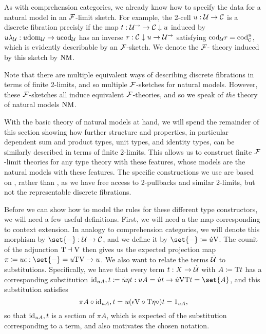\documentclass[../thesis.tex]{subfiles}
\begin{document}
As with comprehension categories, we already know how to specify the data for a natural model in an ${\mathcal{F}}$-limit
sketch. For example, the 2-cell $u : {\mathcal{U}} \to {\mathcal{C}}$ is a discrete fibration precisly if the map $t : {\mathcal{U}}^\to \to
{\mathcal{C}} \mathrel{\downarrow} u$ induced by $u \lambda_{\mathcal{U}} : u{\mathrm{dom}}_{\mathcal{U}} \to u{\mathrm{cod}}_{\mathcal{U}}$ has an inverse $r : {\mathcal{C}} \mathrel{\downarrow} u \to {\mathcal{U}}^\to$
satisfying ${\mathrm{cod}}_{\mathcal{U}} r = {\mathrm{cod}}_{\mathcal{C}}^u$, which is evidently describable by an ${\mathcal{F}}$-sketch. We denote the ${\mathcal{F}}$-%
theory induced by this sketch by ${\mathrm{NM}}$.
\begin{remark}
  Note that there are multiple equivalent ways of describing discrete fibrations in terms of finite 2-limits, and
  so multiple ${\mathcal{F}}$-sketches for natural models. However, these ${\mathcal{F}}$-sketches all induce equivalent ${\mathcal{F}}$-theories,
  and so we speak of \emph{the} theory of natural models ${\mathrm{NM}}$.
\end{remark}

With the basic theory of natural models at hand, we will spend the remainder of this section showing how further
structure and properties, in particular dependent sum and product types, unit types, and identity types, can
be similarly described in terms of finite 2-limits. This allows us to construct finite ${\mathcal{F}}$-limit theories
for any type theory with these features, whose models are the natural models with these features. The specific
constructions we use are based on \cite{coraglia2024a}, rather than \cite{awodey2017}, as we have free access
to 2-pullbacks and similar 2-limits, but not the representable discrete fibrations.

Before we can show how to model the rules for these different type constructors, we will need a few useful definitions.
First, we will need a the map corresponding to context extension. In analogy to comprehension categories, we will denote
this morphism by $\set{-} : \cU \to \cC$, and we define it by $\set{-} \coloneq \dot u \var$. The counit of the adjunction
${{\mathrm{T}}} \dashv {{\mathrm{V}}}$ then gives us the expected projection map $\pi \coloneq u \epsilon : \set{-} = u\typ\var \to u$. We also
want to relate the terms $\dot{{\mathcal{U}}}$ to substitutions. Specifically, we have that every term $t : X \to \dot{{\mathcal{U}}}$ with
$A \coloneq {{\mathrm{T}}} t$ has a corresponding substitution $\id_{u A},t \coloneq \dot u \eta t : uA = \dot u t \to \dot u \var\typ t =
\set{A}$, and this substitution satisfies
\[\pi A \circ {\mathrm{id}}_{uA},t = u(\epsilon{{\mathrm{V}}} \circ {{\mathrm{T}}} \eta \circ)t = 1_{u A},\]
so that ${\mathrm{id}}_{uA},t$ is a section of $\pi A$, which is expected of the substitution corresponding to a term, and also motivates
the chosen notation.
\end{document}
